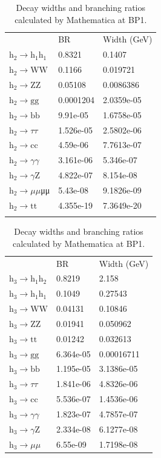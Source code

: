 \documentclass[12pt]{article}
\begin{document}
	\begin{table}[htpb]
		\centering
		\caption{Decay widths and branching ratios calculated by Mathematica at BP1.}
		\label{tab:MA_decay_widths_BR}
		\begin{tabular}{lll}
									  & BR        & Width (GeV) \\
			$\text{h}_2\to\text{h}_1\text{h}_1$     & 0.8321    & 0.1407      \\
			$\text{h}_2\to\text{WW}$       & 0.1166    & 0.019721    \\
			$\text{h}_2\to\text{ZZ}$       & 0.05108   & 0.0086386   \\
			$\text{h}_2\to\text{gg}$       & 0.0001204 & 2.0359e-05  \\
			$\text{h}_2\to\text{bb}$       & 9.91e-05  & 1.6758e-05  \\
			$\text{h}_2\to\tau\tau$       & 1.526e-05 & 2.5802e-06  \\
			$\text{h}_2\to\text{cc}$       & 4.59e-06  & 7.7613e-07  \\
			$\text{h}_2\to\gamma\gamma$       & 3.161e-06 & 5.346e-07   \\
			$\text{h}_2\to\gamma\text{Z}$       & 4.822e-07 & 8.154e-08   \\
			$\text{h}_2\to\mu\mu$μμ       & 5.43e-08  & 9.1826e-09  \\
			$\text{h}_2\to\text{tt}$       & 4.355e-19 & 7.3649e-20  \\
			\\
		\end{tabular}		
		\begin{tabular}{lll}
								  & BR        & Width (GeV) \\
			$\text{h}_3\to\text{h}_1\text{h}_2$ & 0.8219    & 2.158       \\
			$\text{h}_3\to\text{h}_1\text{h}_1$ & 0.1049    & 0.27543     \\
			$\text{h}_3\to\text{WW}$   & 0.04131   & 0.10846     \\
			$\text{h}_3\to\text{ZZ}$   & 0.01941   & 0.050962    \\
			$\text{h}_3\to\text{tt}$   & 0.01242   & 0.032613    \\
			$\text{h}_3\to\text{gg}$   & 6.364e-05 & 0.00016711  \\
			$\text{h}_3\to\text{bb}$   & 1.195e-05 & 3.1386e-05  \\
			$\text{h}_3\to\tau\tau$   & 1.841e-06 & 4.8326e-06  \\
			$\text{h}_3\to\text{cc}$   & 5.536e-07 & 1.4536e-06  \\
			$\text{h}_3\to\gamma\gamma$   & 1.823e-07 & 4.7857e-07  \\
			$\text{h}_3\to\gamma\text{Z}$   & 2.334e-08 & 6.1277e-08  \\
			$\text{h}_3\to\mu\mu$   & 6.55e-09  & 1.7198e-08  
		\end{tabular}
	\end{table}
\end{document}

